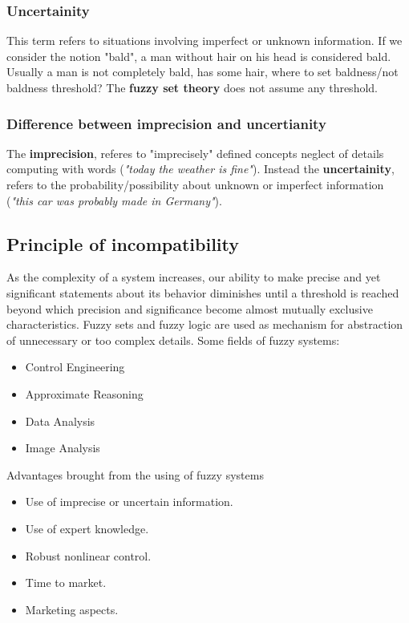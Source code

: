 \documentclass{article}
\begin{document}
\subsubsection{Uncertainity}
This term refers to situations involving imperfect or unknown information. If we
consider the notion "bald", a man without hair on his head is considered bald.
\newline\newline
Usually a man is not completely bald, has some hair, where to set baldness/not baldness
threshold?
\newline\newline
The \textbf{fuzzy set theory} does not assume any threshold.

\subsubsection{Difference between imprecision and uncertianity}
The \textbf{imprecision}, referes to "imprecisely"
defined concepts neglect of details computing with words (\textit{"today the
    weather is fine"}). Instead the \textbf{uncertainity}, refers to the probability/possibility
about unknown or imperfect information (\textit{"this car was probably made in Germany"}).

\subsection{Principle of incompatibility}
As the complexity of a system increases, our ability to make precise and yet significant
statements about its behavior diminishes until a threshold is reached beyond which precision
and significance become almost mutually exclusive characteristics.
\newline\newline
Fuzzy sets and fuzzy logic are used as mechanism for abstraction of unnecessary or too
complex details.
Some fields of fuzzy systems:
\begin{itemize}
    \item Control Engineering
    \item Approximate Reasoning
    \item Data Analysis
    \item Image Analysis
\end{itemize}
Advantages brought from the using of fuzzy systems
\begin{itemize}
    \item Use of imprecise or uncertain information.
    \item Use of expert knowledge.
    \item Robust nonlinear control.
    \item Time to market.
    \item Marketing aspects.
\end{itemize}
\end{document}
